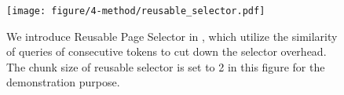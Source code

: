 \begin{figure}[t]
    \centering
    \texttt{[image: figure/4-method/reusable\_selector.pdf]}
    \caption{We introduce Reusable Page Selector in \system, which utilize the similarity of queries of consecutive tokens to cut down the selector overhead. The chunk size of reusable selector is set to 2 in this figure for the demonstration purpose.
    }
\label{fig:method:reusable_selector}
\end{figure}

